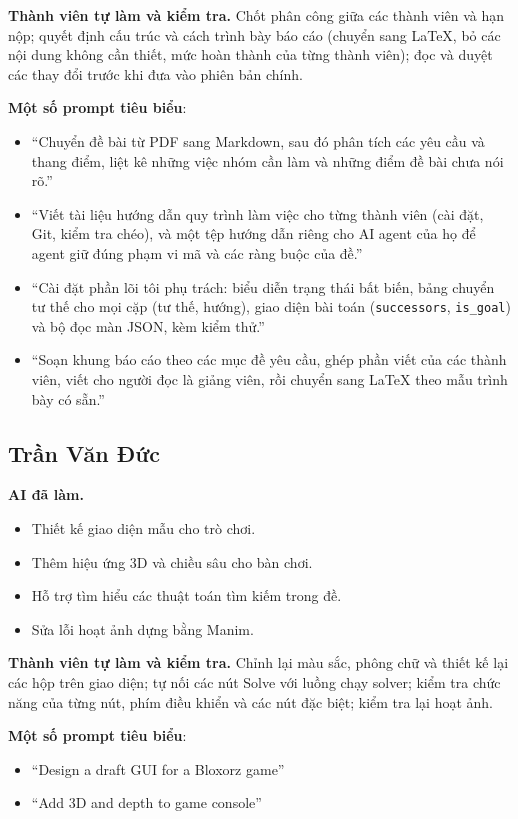 \textbf{Thành viên tự làm và kiểm tra.} Chốt phân công giữa các thành viên và hạn nộp; quyết định cấu trúc và cách trình bày báo cáo (chuyển sang \LaTeX{}, bỏ các nội dung không cần thiết, mức hoàn thành của từng thành viên); đọc và duyệt các thay đổi trước khi đưa vào phiên bản chính.

\textbf{Một số prompt tiêu biểu}:
\begin{itemize}
\item ``Chuyển đề bài từ PDF sang Markdown, sau đó phân tích các yêu cầu và thang điểm, liệt kê những việc nhóm cần làm và những điểm đề bài chưa nói rõ.''
\item ``Viết tài liệu hướng dẫn quy trình làm việc cho từng thành viên (cài đặt, Git, kiểm tra chéo), và một tệp hướng dẫn riêng cho AI agent của họ để agent giữ đúng phạm vi mã và các ràng buộc của đề.''
\item ``Cài đặt phần lõi tôi phụ trách: biểu diễn trạng thái bất biến, bảng chuyển tư thế cho mọi cặp (tư thế, hướng), giao diện bài toán (\texttt{successors}, \texttt{is\_goal}) và bộ đọc màn JSON, kèm kiểm thử.''
\item ``Soạn khung báo cáo theo các mục đề yêu cầu, ghép phần viết của các thành viên, viết cho người đọc là giảng viên, rồi chuyển sang \LaTeX{} theo mẫu trình bày có sẵn.''
\end{itemize}

\subsection*{Trần Văn Đức}

\textbf{AI đã làm.}
\begin{itemize}
\item Thiết kế giao diện mẫu cho trò chơi.
\item Thêm hiệu ứng 3D và chiều sâu cho bàn chơi.
\item Hỗ trợ tìm hiểu các thuật toán tìm kiếm trong đề.
\item Sửa lỗi hoạt ảnh dựng bằng Manim.
\end{itemize}

\textbf{Thành viên tự làm và kiểm tra.} Chỉnh lại màu sắc, phông chữ và thiết kế lại các hộp trên giao diện; tự nối các nút Solve với luồng chạy solver; kiểm tra chức năng của từng nút, phím điều khiển và các nút đặc biệt; kiểm tra lại hoạt ảnh.

\textbf{Một số prompt tiêu biểu}:
\begin{itemize}
\item ``Design a draft GUI for a Bloxorz game''
\item ``Add 3D and depth to game console''
\end{itemize}

